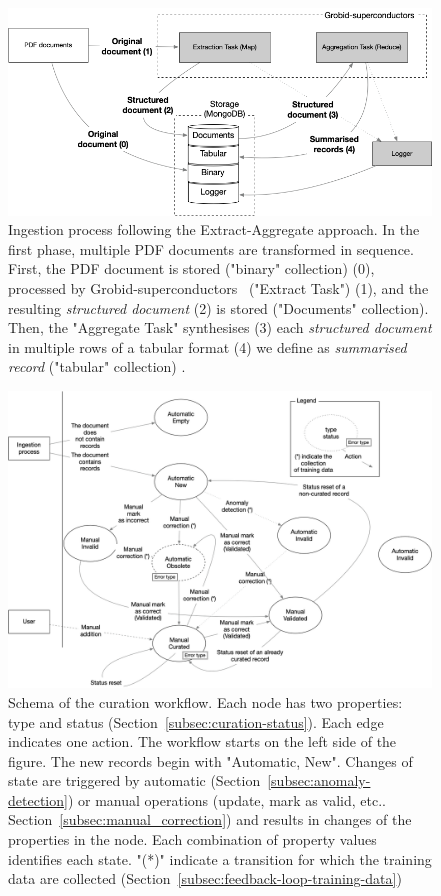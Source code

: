 \documentclass[]{interact}
\theoremstyle{plain} %
\theoremstyle{definition}
\theoremstyle{remark}
\begin{document}
\begin{figure}[ht]
  \centering
  \includegraphics[width=\textwidth]{images/ingestion-schema.png} 
  \caption{Ingestion process following the Extract-Aggregate approach. In the first phase, multiple PDF documents are transformed in sequence. First, the PDF document is stored ("binary" collection) (0), processed by Grobid-superconductors~\cite{lfoppiano2023automatic} ("Extract Task") (1), and the resulting \textit{structured document} (2) is stored ("Documents" collection). 
  Then, the "Aggregate Task" synthesises (3) each \textit{structured document} in multiple rows of a tabular format (4) we define as \textit{summarised record} ("tabular" collection) .}
  \label{fig:map-reduce}
\end{figure}

\begin{figure}[ht]
  \centering
  \includegraphics[width=1\textwidth]{images/record-correction} 
  \caption{Schema of the curation workflow. Each node has two properties: type and status (Section~\ref{subsec:curation-status}). Each edge indicates one action. The workflow starts on the left side of the figure. The new records begin with "Automatic, New". Changes of state are triggered by automatic (Section~\ref{subsec:anomaly-detection}) or manual operations (update, mark as valid, etc.. Section~\ref{subsec:manual_correction}) and results in changes of the properties in the node. Each combination of property values identifies each state. "(*)" indicate a transition for which the training data are collected (Section~\ref{subsec:feedback-loop-training-data})}
  \label{fig:curation-workflow}
\end{figure}
\end{document}
